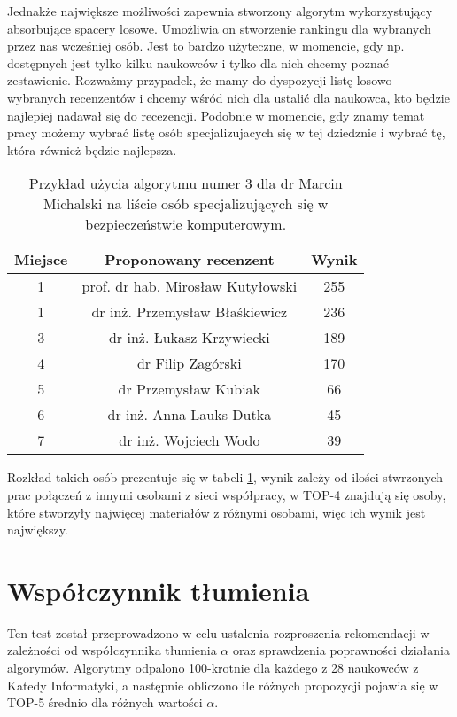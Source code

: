 Jednakże największe możliwości zapewnia stworzony algorytm wykorzystujący absorbujące spacery losowe. Umożliwia on stworzenie rankingu dla wybranych przez nas wcześniej osób. Jest to bardzo użyteczne, w momencie, gdy np. dostępnych jest tylko kilku naukowców i tylko dla nich chcemy poznać zestawienie. Rozważmy przypadek, że mamy do dyspozycji listę losowo wybranych recenzentów i chcemy wśród nich dla ustalić dla naukowca, kto będzie najlepiej nadawał się do recezencji. Podobnie w momencie, gdy znamy temat pracy możemy wybrać listę osób specjalizujacych się w tej dziedznie i wybrać tę, która również będzie najlepsza.


\begin{table}[h]
        \centering
\begin{tabular}{c|c|c}
Miejsce  & Proponowany recenzent & Wynik \\  \hline
1&prof. dr hab. Mirosław Kutyłowski &255 \\
1&dr inż. Przemysław Błaśkiewicz&236 \\
3&dr inż. Łukasz Krzywiecki &189 \\
4&dr Filip Zagórski&170 \\
5&dr Przemysław Kubiak& 66 \\
6&dr inż. Anna Lauks-Dutka& 45 \\
7&dr inż. Wojciech Wodo& 39 \\

\end{tabular}
\caption{Przykład użycia algorytmu numer 3 dla dr Marcin Michalski na liście osób specjalizujących się w bezpieczeństwie komputerowym.}
\label{table:4}
\end{table}

Rozkład takich osób prezentuje się w tabeli \ref{table:4}, wynik zależy od ilości stwrzonych prac połączeń z innymi osobami z sieci współpracy, w TOP-4 znajdują się osoby, które stworzyły najwięcej materiałów z różnymi osobami, więc ich wynik jest największy.


\section{Współczynnik tłumienia}


Ten test został przeprowadzono w celu ustalenia rozproszenia rekomendacji w zależności od współczynnika tłumienia $\alpha$ oraz sprawdzenia poprawności działania algorymów. Algorytmy odpalono 100-krotnie dla każdego z 28 naukowców z Katedy Informatyki, a następnie obliczono ile różnych propozycji pojawia się w TOP-5 średnio dla różnych wartości $\alpha$.


